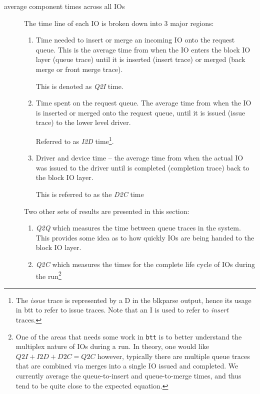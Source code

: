 \documentclass{article}
\begin{document}
\begin{description}
  \item[average component times across all IOs] The time line of each IO
  is broken down into 3 major regions:

    \begin{enumerate}
      \item Time needed to insert or merge an incoming IO onto the request
      queue. This is the average time from when the IO enters the block
      IO layer (queue trace) until it is inserted (insert trace) or merged
      (back merge or front merge trace).

      This is denoted as \emph{Q2I} time.

      \item Time spent on the request queue. The average time from when
      the IO is inserted or merged onto the request queue, until it is
      issued (issue trace) to the lower level driver.

      Referred to as \emph{I2D} time\footnote{The \emph{issue} trace
      is represented by a D in the blkparse output, hence its usage in
      btt to refer to issue traces. Note that an I is used to refer to
      \emph{insert} traces.}.

      \item Driver and device time -- the average time from when the
      actual IO was issued to the driver until is completed (completion
      trace) back to the block IO layer.

      This is referred to as the \emph{D2C} time\
    \end{enumerate}

  Two other sets of results are presented in this section:

    \begin{enumerate}
      \item \emph{Q2Q} which measures the time between queue traces
      in the system. This provides some idea as to how quickly IOs are
      being handed to the block IO layer.

      \item \emph{Q2C} which measures the times for the complete life cycle
      of IOs during the run\footnote{One of the areas that needs some
      work in \texttt{btt} is to better understand the multiplex nature of
      IOs during a run. In theory, one would like ${Q2I} + {I2D} + {D2C}
      = {Q2C}$ however, typically there are multiple queue traces that
      are combined via merges into a single IO issued and completed. We
      currently average the queue-to-insert and queue-to-merge times,
      and thus tend to be quite close to the expected equation.}


\end{enumerate}
\end{description}
\end{document}
